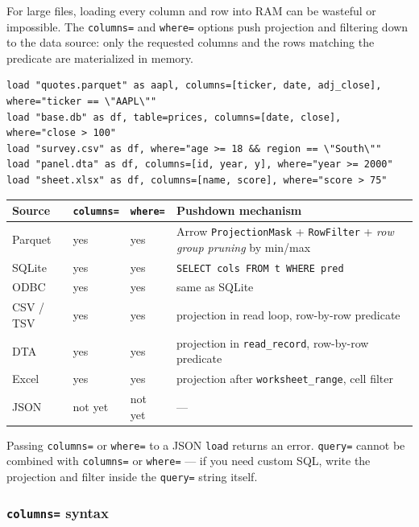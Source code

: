 For large files, loading every column and row into RAM can be wasteful or
impossible. The \texttt{columns=} and \texttt{where=} options push projection
and filtering down to the data source: only the requested columns and the
rows matching the predicate are materialized in memory.

\begin{lstlisting}[caption={Column and filter pushdown}]
load "quotes.parquet" as aapl, columns=[ticker, date, adj_close], where="ticker == \"AAPL\""
load "base.db" as df, table=prices, columns=[date, close], where="close > 100"
load "survey.csv" as df, where="age >= 18 && region == \"South\""
load "panel.dta" as df, columns=[id, year, y], where="year >= 2000"
load "sheet.xlsx" as df, columns=[name, score], where="score > 75"
\end{lstlisting}

\begin{center}
\begin{tabular}{llll}
\toprule
\textbf{Source} & \textbf{\texttt{columns=}} & \textbf{\texttt{where=}} & \textbf{Pushdown mechanism} \\
\midrule
Parquet   & yes & yes & Arrow \texttt{ProjectionMask} + \texttt{RowFilter} + \textit{row group pruning} by min/max \\
SQLite    & yes & yes & \texttt{SELECT cols FROM t WHERE pred} \\
ODBC      & yes & yes & same as SQLite \\
CSV / TSV & yes & yes & projection in read loop, row-by-row predicate \\
DTA       & yes & yes & projection in \texttt{read\_record}, row-by-row predicate \\
Excel     & yes & yes & projection after \texttt{worksheet\_range}, cell filter \\
JSON      & not yet & not yet & --- \\
\bottomrule
\end{tabular}
\end{center}

Passing \texttt{columns=} or \texttt{where=} to a JSON \texttt{load} returns
an error. \texttt{query=} cannot be combined with \texttt{columns=} or
\texttt{where=} --- if you need custom SQL, write the projection and filter
inside the \texttt{query=} string itself.

\subsubsection*{\texttt{columns=} syntax}

